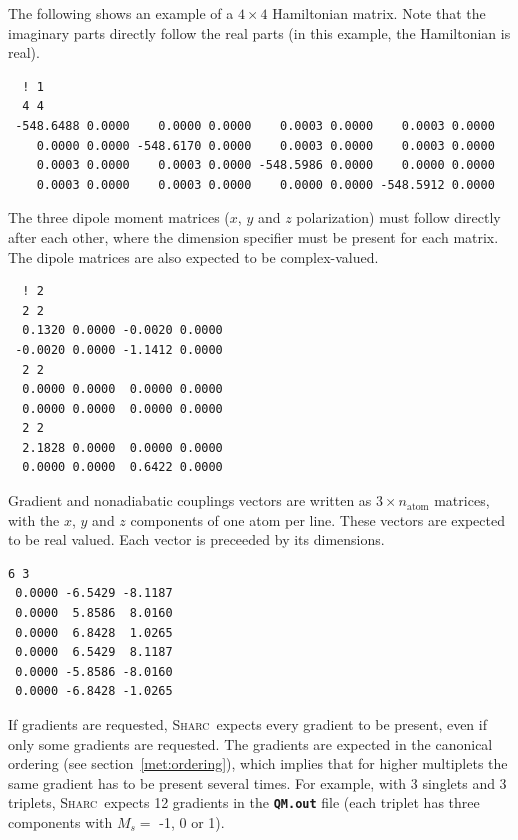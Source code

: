 \documentclass[a4paper,10pt,DIV=15,openany,twoside=false]{scrbook}
\newcommand{\sharc}{\textsc{Sharc}}
\newcommand{\ttt}[1]{\textbf{\texttt{#1}}}
\newenvironment{example}{
  \setlength{\OuterFrameSep}{3pt}
  \vspace{0mm}
  \definecolor{shadecolor}{HTML}{E4F4FF}
  \begin{shaded}
}{
  \end{shaded}
}
\begin{document}
The following shows an example of a $4\times 4$ Hamiltonian matrix. Note that the imaginary parts directly follow the real parts (in this example, the Hamiltonian is real).
\begin{example}
  \begin{verbatim}
  ! 1
  4 4
 -548.6488 0.0000    0.0000 0.0000    0.0003 0.0000    0.0003 0.0000
    0.0000 0.0000 -548.6170 0.0000    0.0003 0.0000    0.0003 0.0000
    0.0003 0.0000    0.0003 0.0000 -548.5986 0.0000    0.0000 0.0000
    0.0003 0.0000    0.0003 0.0000    0.0000 0.0000 -548.5912 0.0000
\end{verbatim}
\end{example}

The three dipole moment matrices ($x$, $y$ and $z$ polarization) must follow directly after each other, where the dimension specifier must be present for each matrix. The dipole matrices are also expected to be complex-valued.
\begin{example}
  \begin{verbatim}
  ! 2
  2 2
  0.1320 0.0000 -0.0020 0.0000
 -0.0020 0.0000 -1.1412 0.0000
  2 2
  0.0000 0.0000  0.0000 0.0000
  0.0000 0.0000  0.0000 0.0000
  2 2
  2.1828 0.0000  0.0000 0.0000
  0.0000 0.0000  0.6422 0.0000
\end{verbatim}
\end{example}

Gradient and nonadiabatic couplings vectors are written as $3\times n_\text{atom}$ matrices, with the $x$, $y$ and $z$ components of one atom per line. These vectors are expected to be real valued. Each vector is preceeded by its dimensions.
\begin{example}
  \begin{verbatim}
6 3 
 0.0000 -6.5429 -8.1187
 0.0000  5.8586  8.0160
 0.0000  6.8428  1.0265
 0.0000  6.5429  8.1187
 0.0000 -5.8586 -8.0160
 0.0000 -6.8428 -1.0265
\end{verbatim}
\end{example}
If gradients are requested, \sharc\ expects every gradient to be present, even if only some gradients are requested. The gradients are expected in the canonical ordering (see section~\ref{met:ordering}), which implies that for higher multiplets the same gradient has to be present several times. For example, with 3 singlets and 3 triplets, \sharc\ expects 12 gradients in the \ttt{QM.out} file (each triplet has three components with $M_s=$ -1, 0 or 1).
\end{document}
